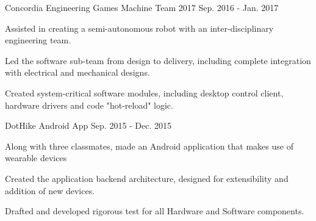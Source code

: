 \begin{cventries}
  \cventry
    {Concordia Engineering Games Machine Team 2017} %
    {} %
    {} %
    {Sep. 2016 - Jan. 2017} %
    {
      \begin{cvitems} %
        \item {Assisted in creating a semi-autonomous robot with an inter-disciplinary engineering team.}
        \item {Led the software sub-team from design to delivery, including complete integration with electrical and mechanical designs.}
        \item {Created system-critical software modules, including desktop control client, hardware drivers and code "hot-reload" logic.}
        \\
      \end{cvitems}
    }
    
  \cventry
    {DotHike Android App} %
    {} %
    {} %
    {Sep. 2015 - Dec. 2015} %
    {
      \begin{cvitems} %
        \item {Along with three classmates, made an Android application that makes use of wearable devices}
        \item {Created the application backend architecture, designed for extensibility and addition of new devices.}
        \item {Drafted and developed rigorous test for all Hardware and Software components.}
        \\
      \end{cvitems}
    }

\end{cventries}
